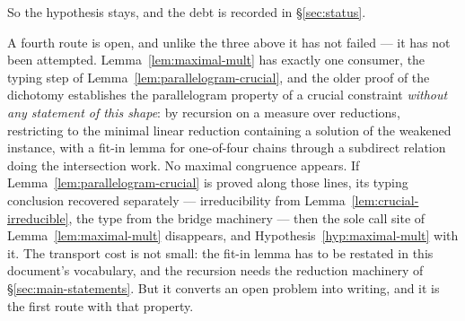 \begin{hazard}
So the hypothesis stays, and the debt is recorded in \S\ref{sec:status}.

A fourth route is open, and unlike the three above it has not failed --- it
has not been attempted. Lemma~\ref{lem:maximal-mult} has exactly one consumer,
the typing step of Lemma~\ref{lem:parallelogram-crucial}, and the older proof
of the dichotomy establishes the parallelogram property of a crucial
constraint \emph{without any statement of this shape}: by recursion on a
measure over reductions, restricting to the minimal linear reduction
containing a solution of the weakened instance, with a fit-in lemma for
one-of-four chains through a subdirect relation doing the intersection work.
No maximal congruence appears. If Lemma~\ref{lem:parallelogram-crucial} is
proved along those lines, its typing conclusion recovered separately ---
irreducibility from Lemma~\ref{lem:crucial-irreducible}, the type from the
bridge machinery --- then the sole call site of
Lemma~\ref{lem:maximal-mult} disappears, and
Hypothesis~\ref{hyp:maximal-mult} with it. The transport cost is not small:
the fit-in lemma has to be restated in this document's vocabulary, and the
recursion needs the reduction machinery of \S\ref{sec:main-statements}. But it
converts an open problem into writing, and it is the first route with that
property.
\end{hazard}
